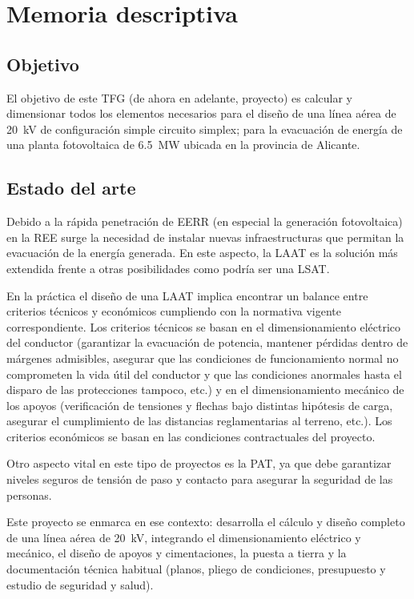 \chapter{Memoria descriptiva}
\label{ch:md}
\section{Objetivo}
\label{sec:md-objetivo}
El objetivo de este TFG (de ahora en adelante, proyecto) es calcular y dimensionar todos los elementos necesarios para el diseño de una línea aérea de \SI{20}{\kilo\volt} de configuración simple circuito simplex; para la evacuación de energía de una planta fotovoltaica de \SI{6.5}{\mega\watt} ubicada en la provincia de Alicante. 
\section{Estado del arte}
\label{sec:md-estadoArte}
Debido a la rápida penetración de \ac{EERR} (en especial la generación fotovoltaica) en la \ac{REE} surge la necesidad de instalar nuevas infraestructuras que permitan la evacuación de la energía generada. En este aspecto, la \ac{LAAT} es la solución más extendida frente a otras posibilidades como podría ser una \ac{LSAT}.

En la práctica el diseño de una \ac{LAAT} implica encontrar un balance entre criterios técnicos y económicos cumpliendo con la normativa vigente correspondiente. Los criterios técnicos se basan en el dimensionamiento eléctrico del conductor (garantizar la evacuación de potencia, mantener pérdidas dentro de márgenes admisibles, asegurar que las condiciones de funcionamiento normal no comprometen la vida útil del conductor y que las condiciones anormales hasta el disparo de las protecciones tampoco, etc.) y en el dimensionamiento mecánico de los apoyos (verificación de tensiones y flechas bajo distintas hipótesis de carga, asegurar el cumplimiento de las distancias reglamentarias al terreno, etc.). Los criterios económicos se basan en las condiciones contractuales del proyecto.

Otro aspecto vital en este tipo de proyectos es la \ac{PAT}, ya que debe garantizar niveles seguros de tensión de paso y contacto para asegurar la seguridad de las personas.

Este proyecto se enmarca en ese contexto: desarrolla el cálculo y diseño completo de una línea aérea de \SI{20}{\kilo\volt}, integrando el dimensionamiento eléctrico y mecánico, el diseño de apoyos y cimentaciones, la puesta a tierra y la documentación técnica habitual (planos, pliego de condiciones, presupuesto y estudio de seguridad y salud).

